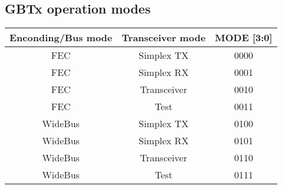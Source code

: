 \subsection{GBTx operation modes} \label{appx:4bit}
\begin{center}
    \begin{tabular}{ccc}
        \toprule
        Enconding/Bus mode & Transceiver mode & MODE [3:0] \\
        \midrule
        FEC & Simplex TX  & 0000 \\
        FEC & Simplex RX  & 0001 \\
        FEC & Transceiver & 0010 \\
        FEC & Test        & 0011 \\
        WideBus & Simplex TX  & 0100 \\
        WideBus & Simplex RX  & 0101 \\
        WideBus & Transceiver & 0110 \\
        WideBus & Test        & 0111 \\
        \bottomrule
    \end{tabular}
    \label{tab:gbtx-modes}
\end{center}
